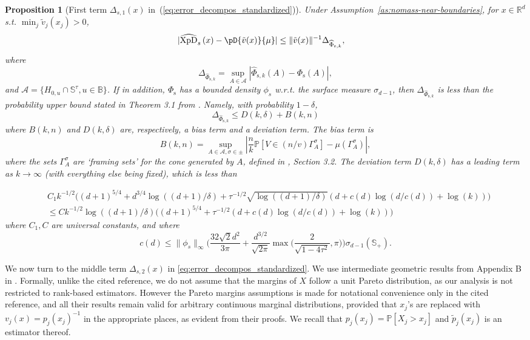 \documentclass{article}
\numberwithin{equation}{section}
\newtheorem{proposition}{Proposition}[section]
\renewcommand{\P}{\mathbb{P}}
\newcommand{\rset}{\mathbb{R}}
\newcommand{\PP}{\P}%
\newcommand{\sphere}{\mathbb{S}}
\newcommand{\ball}{\mathbb{B}}
\newcommand{\XpDsymbol}{\mathrm{XpD}}  %
\newcommand{\coD}[2]{\pD{#1}{#2}}
\newcommand{\hatcoDs}[1]{\widehat{\XpDsymbol}_s\left({#1}\right)}
\newcommand{\mus}{\mu}%
\newcommand{\Phitrad}{\Phi_{\mathrm{s}}} %
\newcommand{\hatPhitrad}{\widehat{\Phi}_{\mathrm{s},k}} %
\begin{document}
\begin{proposition}[First term $\Delta_{s,1}(x)$ in~(\ref{eq:error_decompos_standardized})]\label{prop:bound_error_phitrad}
Under Assumption~\ref{as:nomass-near-boundaries}, for  $x \in\rset^d$
s.t. $\min_j\tilde v_j(x_j)>0$,
\begin{align*}
  |\hatcoDs{x} - \pD{\tilde v(x)}{\mus}|  %
    & \le
    \|\tilde v(x)\|^{-1} \Delta_{\hatPhitrad},
\end{align*}
where
$$
\Delta_{\hatPhitrad}=
\sup_{A \in \mathcal{A}} |\hatPhitrad(A) - \Phitrad(A) |,
$$
and $\mathcal{A} = \{ H_{0,u}\cap \sphere^\tau, u\in\ball \}$.
If in addition, $\Phitrad$ has a bounded density $\phi_s$ w.r.t. the surface measure $\sigma_{d-1}$, then %
$\Delta_{\hatPhitrad}$ is less than the probability upper bound stated
in Theorem 3.1 from
\cite{ClemenconJalalzaiSabourinSegers2023}.  Namely, with probability $1-\delta$,
$$
\Delta_{\hatPhitrad} \le D(k,\delta) + B(k,n)
$$
where $B(k,n)$ and $D(k,\delta)$ are, respectively, a bias term and a
deviation term.  %
The bias term is
$$
B(k,n) = \sup_{A\in\mathcal{A}, \sigma\in\pm} \left| \frac{n}{k} \PP[V \in (n/v) \Gamma_{A}^\sigma]  - \mus(\Gamma_A^\sigma)\right|,
$$
where the sets $\Gamma_A^\sigma$ are `framing sets' for the cone
generated by $A$, defined in
\cite{ClemenconJalalzaiSabourinSegers2023}, Section 3.2.
The deviation term $D(k,\delta)$ has a leading term as $k \to \infty$ (with everything else being fixed), which is  less than

\begin{align}
&C_1 k^{-1/2}  \Big(   (d+1)^{5/4} + d^{3/4} \log((d+1)/\delta) +
\tau^{-1/2} \sqrt{\log((d+1)/\delta)} (d + c(d) \log(d/c(d)) + \log(k))
  \Big)  \nonumber\\
& \le
C k^{-1/2}  \log((d+1)/\delta) \Big(   (d+1)^{5/4} +
\tau^{-1/2}  (d + c(d) \log(d/c(d)) + \log(k))
  \Big) \label{eq:bound_variance_term_angularmeasure}
  \end{align}
where $C_1,C$  are universal constants, and where 
$$
c(d) \le \|\phi_s\|_\infty\bigg(
 \frac{32\sqrt{2} d^{2}}{3\pi} + 
 \frac{d^{3/2}}{\sqrt{2\pi}}
      \max\Big(\frac{2 }{\sqrt{1 - 4\tau^2}}, 
       \pi %
       \Big)
\bigg)\sigma_{d-1}(\sphere_+).
$$

  \end{proposition}



We now turn to  the middle term $\Delta_{s,2}(x)$ in \eqref{eq:error_decompos_standardized}. We use intermediate geometric results from Appendix B in \cite{ClemenconJalalzaiSabourinSegers2023}. Formally, unlike the cited reference, we do not assume that the margins of \( X \) follow a unit Pareto distribution, as our analysis is not restricted to rank-based estimators. However the Pareto margins assumptions is made for notational convenience only in the cited reference, and all their  results  remain valid for arbitrary continuous marginal distributions, provided that \( x_j \)'s are replaced with \(v_j(x) =  p_j(x_j)^{-1} \) in the appropriate places, as evident from their proofs. We recall that \( p_j(x_j) = \PP[X_j > x_j] \) and \( \tilde{p}_j(x_j) \) is an estimator thereof. 
\end{document}
